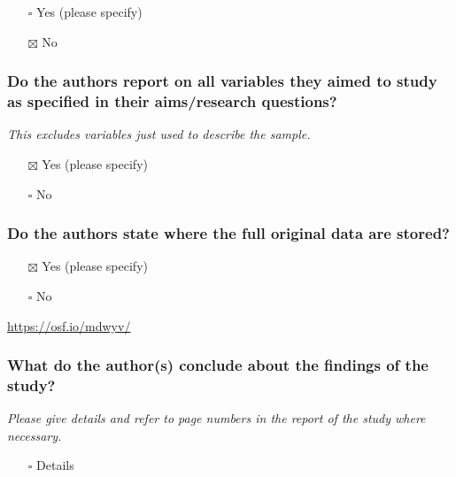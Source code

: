 \documentclass[
  doc, a4paper]{apa7}
\providecommand{\tightlist}{%
  \setlength{\itemsep}{0pt}\setlength{\parskip}{0pt}}
\begin{document}
\begin{itemize}
\tightlist
\item[$\square$]
  Yes (please specify)
\item[$\boxtimes$]
  No
\end{itemize}

\subsubsection{Do the authors report on all variables they aimed to study as specified in their aims/research questions?}\label{do-the-authors-report-on-all-variables-they-aimed-to-study-as-specified-in-their-aimsresearch-questions}

\emph{This excludes variables just used to describe the sample.}

\begin{itemize}
\tightlist
\item[$\boxtimes$]
  Yes (please specify)
\item[$\square$]
  No
\end{itemize}

\subsubsection{Do the authors state where the full original data are stored?}\label{do-the-authors-state-where-the-full-original-data-are-stored}

\begin{itemize}
\tightlist
\item[$\boxtimes$]
  Yes (please specify)
\item[$\square$]
  No
\end{itemize}

\url{https://osf.io/mdwyv/}

\subsubsection{What do the author(s) conclude about the findings of the study?}\label{what-do-the-authors-conclude-about-the-findings-of-the-study}

\emph{Please give details and refer to page numbers in the report of the study where necessary.}

\begin{itemize}
\tightlist
\item[$\square$]
  Details
\end{itemize}
\end{document}
